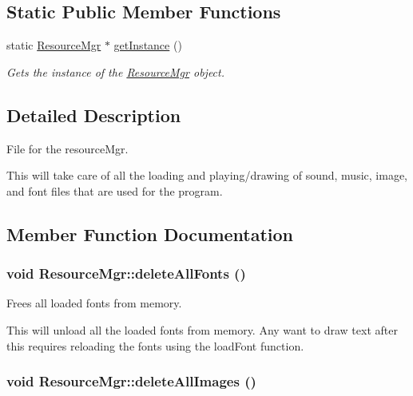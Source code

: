 \subsection*{Static Public Member Functions}
\begin{CompactItemize}
\item 
static \hyperlink{class_resource_mgr}{ResourceMgr} $\ast$ \hyperlink{class_resource_mgr_ec5d2a10ae64caa3ad718ba9881acd0a}{getInstance} ()
\begin{CompactList}\small\item\em Gets the instance of the \hyperlink{class_resource_mgr}{ResourceMgr} object. \item\end{CompactList}\end{CompactItemize}


\subsection{Detailed Description}
File for the resourceMgr. 

This will take care of all the loading and playing/drawing of sound, music, image, and font files that are used for the program. 

\subsection{Member Function Documentation}
\hypertarget{class_resource_mgr_f32105981599e95feec6b53cb699b8ec}{
\subsubsection[{deleteAllFonts}]{\setlength{\rightskip}{0pt plus 5cm}void ResourceMgr::deleteAllFonts ()}}
\label{class_resource_mgr_f32105981599e95feec6b53cb699b8ec}


Frees all loaded fonts from memory. 

This will unload all the loaded fonts from memory. Any want to draw text after this requires reloading the fonts using the loadFont function. \hypertarget{class_resource_mgr_4e46b2808b9ff113d2a3248c9adfe82e}{
\subsubsection[{deleteAllImages}]{\setlength{\rightskip}{0pt plus 5cm}void ResourceMgr::deleteAllImages ()}}
\label{class_resource_mgr_4e46b2808b9ff113d2a3248c9adfe82e}


